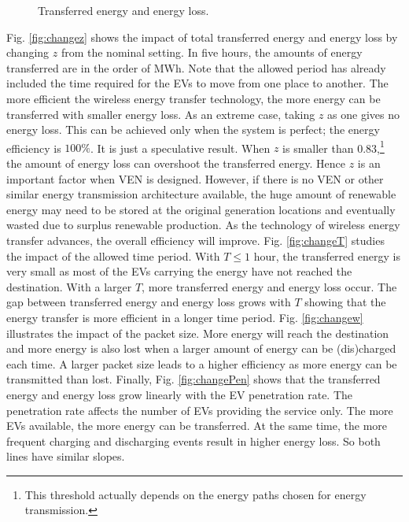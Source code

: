 \documentclass[journal]{IEEEtran}
\begin{document}
\begin{figure*}[!t]
	\begin{center}
	\end{center}
	\caption{Transferred energy and energy loss.}
  \label{fig:sim}
\end{figure*}


Fig. \ref{fig:changez} shows the impact of total transferred energy and energy loss by changing $z$ from the nominal setting. In five hours, the amounts of energy transferred are in the order of MWh. Note that the allowed period has already included the time required for the EVs to move from one place to another. The more efficient the wireless energy transfer technology, the more energy can be transferred with smaller energy loss.
As an extreme case, taking $z$ as one gives no energy loss. This can be achieved only when the system is perfect; the energy efficiency is $100\%$. It is just a speculative result.
When $z$ is smaller than 0.83,\footnote{This threshold actually depends on the energy paths chosen for energy transmission.} the amount of energy loss can overshoot the transferred energy. Hence $z$ is an important factor when VEN is designed. However, if there is no VEN or other similar energy transmission architecture available, the huge amount of renewable energy may need to be stored at the original generation locations and eventually wasted due to surplus renewable production. As the technology of wireless energy transfer advances, the overall efficiency will improve.
Fig. \ref{fig:changeT} studies the impact of the allowed time period. With $T
\leq 1$ hour, the transferred energy is very small as most of the EVs carrying the energy have not  reached the destination. With a larger $T$, more transferred energy and energy loss occur. The gap between transferred energy and energy loss grows with $T$ showing that the energy transfer is more efficient in a longer time period.
Fig. \ref{fig:changew} illustrates the impact of the packet size. More energy will reach the destination and more energy is  also lost when a larger amount of energy can be (dis)charged each time. A larger packet size leads to a higher efficiency as more energy can be transmitted than  lost. 
Finally, Fig. \ref{fig:changePen} shows that the transferred energy and energy loss grow linearly with the EV penetration rate. The penetration rate affects the number of EVs providing the service only. The more EVs available, the more energy can be transferred. At the same time, the more frequent charging and discharging events result in higher energy loss. So both lines have similar slopes.
\end{document}
